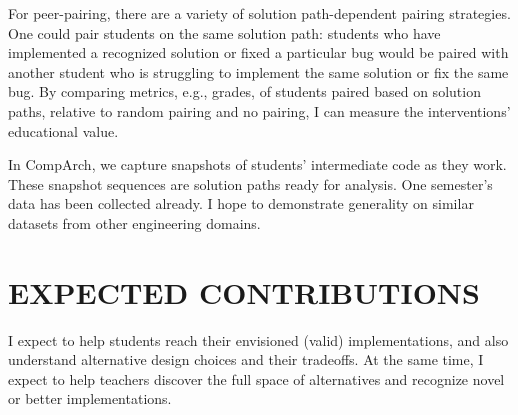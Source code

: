 \documentclass[12pt]{article}
\begin{document}
For peer-pairing, there are a variety of solution path-dependent pairing strategies. One could pair students on the same solution path: students who have implemented a recognized solution or fixed a particular bug would be paired with another student who is struggling to implement the same solution or fix the same bug. By comparing metrics, e.g., grades, of students paired based on solution paths, relative to random pairing and no pairing, I can measure the interventions' educational value.



In CompArch, we capture snapshots of students' intermediate code as they work. These snapshot sequences are solution paths ready for analysis. One semester's data has been collected already. I hope to demonstrate generality on similar datasets from other engineering domains.

\section{EXPECTED CONTRIBUTIONS}

I expect to help students reach their envisioned (valid) implementations, and also understand alternative design choices and their tradeoffs. At the same time, I expect to help teachers discover the full space of alternatives and recognize novel or better implementations.
\end{document}
